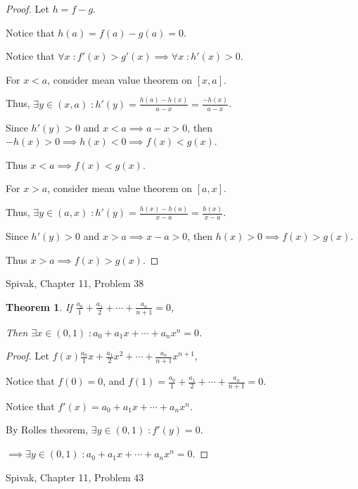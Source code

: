 \documentclass{article} %
\theoremstyle{plain}
\newtheorem*{theorem*}{Theorem}
\theoremstyle{definition}
\begin{document}
\begin{proof}
    Let $h = f - g$.

    Notice that $h(a) = f(a) - g(a) = 0$.

    Notice that $\forall x \; \colon f'(x) > g'(x) \implies \forall x \; \colon h'(x) > 0$.

    For $x < a$, consider mean value theorem on $[x,a]$.

    Thus, $\exists y \in (x,a) \; \colon h'(y) = \frac{h(a) - h(x)}{a -x} = \frac{-h(x)}{a-x}$.

    Since $h'(y) > 0$ and $x < a \implies a-x > 0$, then $-h(x) > 0 \implies h(x) < 0 \implies f(x) < g(x)$.
    
    Thus $x < a \implies f(x) < g(x)$.

    For $x > a$, consider mean value theorem on $[a,x]$.

    Thus, $\exists y \in (a,x) \; \colon h'(y) = \frac{h(x) - h(a)}{x - a} = \frac{h(x)}{x-a}$.

    Since $h'(y) > 0$ and $x > a \implies x-a > 0$, then $h(x) > 0 \implies f(x) > g(x)$.

    Thus $x > a \implies f(x) > g(x)$.
\end{proof}


\noindent{} Spivak, Chapter 11, Problem 38

\begin{theorem*}
    If $\frac{a_0}{1} + \frac{a_1}{2} + \cdots + \frac{a_n}{n+1} = 0$,

    Then $\exists x \in (0,1) \; \colon a_0 + a_1 x + \cdots + a_n x^n = 0$.
\end{theorem*}

\begin{proof}
    Let $f(x) \frac{a_0}{1} x + \frac{a_1}{2} x^2 + \cdots + \frac{a_n}{n+1} x^{n+1}$,

    Notice that $f(0) = 0$, and $f(1) = \frac{a_0}{1} + \frac{a_1}{2} + \cdots + \frac{a_n}{n+1} = 0$.

    Notice that $f'(x) = a_0 + a_1 x + \cdots + a_n x^n$.

    By Rolles theorem, $\exists y \in (0,1) \; \colon f'(y) = 0$.

    $\implies \exists y \in (0,1) \; \colon a_0 + a_1 x + \cdots + a_n x^n = 0$.

\end{proof}

\noindent{} Spivak, Chapter 11, Problem 43
\end{document}
